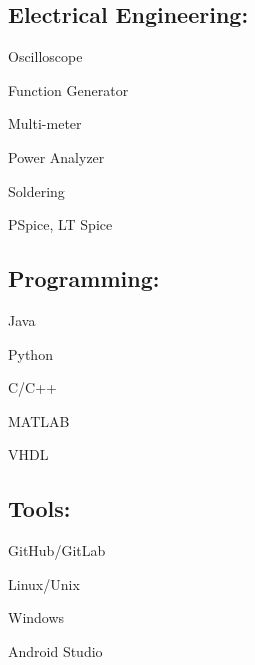 \documentclass[]{wow}
\begin{document}
\begin{minipage}[t]{0.34\textwidth}
\subsection{Electrical Engineering:}
\vspace{0.7em} %
\begin{tightemize}
\setlength{\itemsep}{0pt}
\scriptsize{}
  \item Oscilloscope
  \item Function Generator
  \item Multi-meter
  \item Power Analyzer
  \item Soldering
  \item PSpice, LT Spice
\end{tightemize}

\subsection{Programming:}
\vspace{0.7em} %
\begin{tightemize}
\scriptsize{}
  \item Java 
  \item Python
  \item C/C++
  \item MATLAB
  \item VHDL
\end{tightemize}




\subsection{Tools:}
\vspace{0.7em} %
\begin{tightemize}
\setlength{\itemsep}{0pt}
\scriptsize{}
  \item GitHub/GitLab 
  \item Linux/Unix
  \item Windows
  \item Android Studio
\end{tightemize}



\end{minipage}
\end{document}
